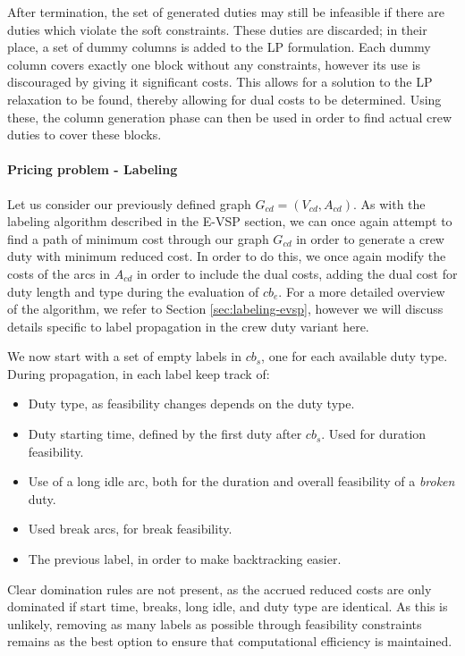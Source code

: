 \documentclass[]{article}
\begin{document}
\noindent After termination, the set of generated duties may still be infeasible if there are duties which violate the soft constraints. These duties are discarded; in their place, a set of dummy columns is added to the LP formulation. Each dummy column covers exactly one block without any constraints, however its use is discouraged by giving it significant costs. This allows for a solution to the LP relaxation to be found, thereby allowing for dual costs to be determined. Using these, the column generation phase can then be used in order to find actual crew duties to cover these blocks.

\paragraph{Pricing problem - Labeling}
Let us consider our previously defined graph $G_{cd} = (V_{cd}, A_{cd})$. As with the labeling algorithm described in the E-VSP section, we can once again attempt to find a path of minimum cost through our graph $G_{cd}$ in order to generate a crew duty with minimum reduced cost. In order to do this, we once again modify the costs of the arcs in $A_{cd}$ in order to include the dual costs, adding the dual cost for duty length and type during the evaluation of $cb_e$. For a more detailed overview of the algorithm, we refer to Section \ref{sec:labeling-evsp}, however we will discuss details specific to label propagation in the crew duty variant here. 

We now start with a set of empty labels in $cb_s$, one for each available duty type. During propagation, in each label keep track of:
\begin{itemize}
  \item Duty type, as feasibility changes depends on the duty type.
  \item Duty starting time, defined by the first duty after $cb_s$. Used for duration feasibility.
  \item Use of a long idle arc, both for the duration and overall feasibility of a \textit{broken} duty.
  \item Used break arcs, for break feasibility. 
  \item The previous label, in order to make backtracking easier. 
\end{itemize}
Clear domination rules are not present, as the accrued reduced costs are only dominated if start time, breaks, long idle, and duty type are identical. As this is unlikely, removing as many labels as possible through feasibility constraints remains as the best option to ensure that computational efficiency is maintained.
\end{document}
